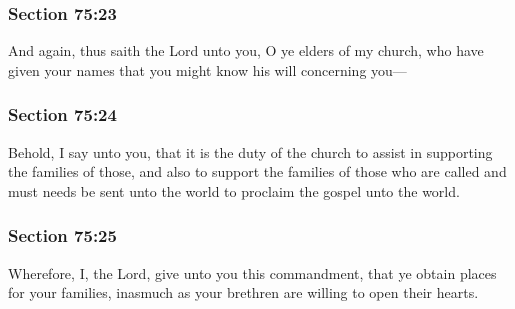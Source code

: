 	\subsubsection{Section 75:23} %
		\label{DC75-23}

		And again, thus saith the Lord unto you, O ye elders of my church, who have given your names that you might know his will concerning you---


	\subsubsection{Section 75:24} %
		\label{DC75-24}

		Behold, I say unto you, that it is the duty of the church to assist in supporting the families of those, and also to support the families of those who are called and must needs be sent unto the world to proclaim the gospel unto the world.


	\subsubsection{Section 75:25} %
		\label{DC75-25}

		Wherefore, I, the Lord, give unto you this commandment, that ye obtain places for your families, inasmuch as your brethren are willing to open their hearts.


